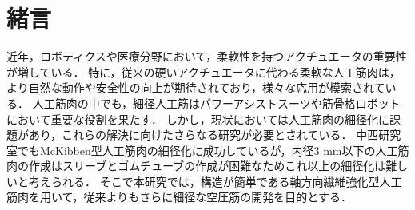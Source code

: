 \newpage
\setcounter{page}{1}
\section{緒言}
近年，ロボティクスや医療分野において，柔軟性を持つアクチュエータの重要性が増している．
特に，従来の硬いアクチュエータに代わる柔軟な人工筋肉は，より自然な動作や安全性の向上が期待されており，様々な応用が模索されている．
人工筋肉の中でも，細径人工筋はパワーアシストスーツや筋骨格ロボットにおいて重要な役割を果たす\cite{1}．
しかし，現状においては人工筋肉の細径化に課題があり，これらの解決に向けたさらなる研究が必要とされている．
中西研究室でもMcKibben型人工筋肉の細径化に成功しているが\cite{2}，内径3 mm以下の人工筋肉の作成はスリーブとゴムチューブの作成が困難なためこれ以上の細径化は難しいと考えられる．
そこで本研究では，構造が簡単である軸方向繊維強化型人工筋肉\cite{3}を用いて，従来よりもさらに細径な空圧筋の開発を目的とする．